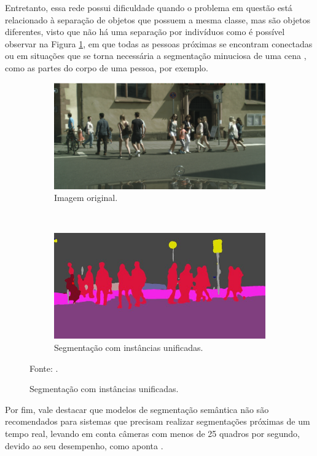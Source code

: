 Entretanto, essa rede possui dificuldade quando o problema em questão está relacionado à separação de objetos que possuem a mesma classe, mas são objetos diferentes, visto que não há uma separação por indivíduos \cite{Kirillov2019a} como é possível observar na Figura \ref{semantic:fig:4.1}, em que todas as pessoas próximas se encontram conectadas ou em situações que se torna necessária a segmentação minuciosa de uma cena \cite{Ghosh2019}, como as partes do corpo de uma pessoa, por exemplo.

\begin{figure}[H]
   \caption{Exemplo de segmentação semântica com instâncias unificadas.}
   \centering
   \label{semantic:fig:4}
    \begin{subfigure}[t]{0.6\textwidth}
        \centering
        \includegraphics[width=1\linewidth]{recursos/imagens/semantic/sema_ori.png}
        \caption{Imagem original.}
        \label{semantic:fig:4.1}
    \end{subfigure}%
    ~ 

    \begin{subfigure}[t]{0.6\textwidth}
        \centering
        \includegraphics[width=1\linewidth]{recursos/imagens/semantic/sema_unified.png}
        \caption{Segmentação com instâncias unificadas.}
        \label{semantic:fig:4.2}
    \end{subfigure}%

    Fonte: \cite{Fischer2017}.
\end{figure}

Por fim, vale destacar que modelos de segmentação semântica não são recomendados para sistemas que precisam realizar segmentações próximas de um tempo real, levando em conta câmeras com menos de 25 quadros por segundo, devido ao seu desempenho, como aponta \cite{Minaee2021}.